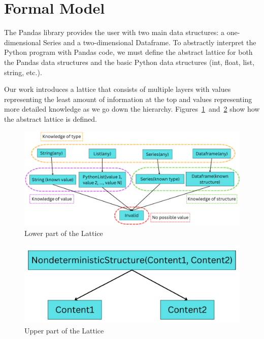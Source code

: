\section{Formal Model}\label{sec:framework}
The Pandas library provides the user with two main data structures:
a one-dimensional Series and a two-dimensional Dataframe.
To abstractly interpret the Python program with Pandas code, we must define the abstract lattice for both the
Pandas data structures and the basic Python data structures (int, float, list, string, etc.).

Our work introduces a lattice that consists of multiple layers with values representing the least amount
of information at the top and values representing more detailed knowledge as we go down the hierarchy.
Figures~\ref{fig:hierarchy}~and~\ref{fig:upper_part} show how the abstract lattice is defined.

\vspace{-1em} %


\begin{figure}[H]
    \caption{Lower part of the Lattice}
    \label{fig:hierarchy}
    \centering
    \includegraphics[scale=0.3]{splash_abstract/img/hier}
\end{figure}

\vspace{-2em} %

\begin{figure}[H]
    \caption{Upper part of the Lattice}
    \label{fig:upper_part}
    \centering
    \includegraphics[scale=0.3]{poster/img/nondeterm}
\end{figure}

